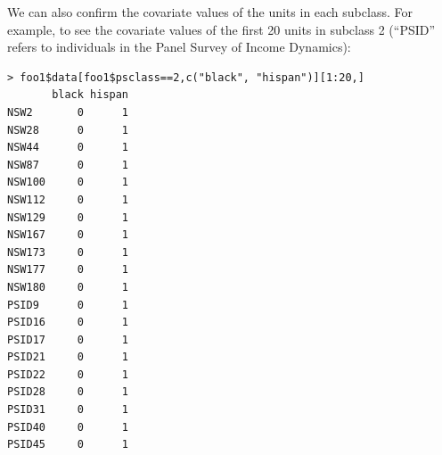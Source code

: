 \documentclass[oneside,letterpaper,titlepage]{article}
\begin{document}
We can also confirm the covariate values of the units in each
subclass.  For example, to see the covariate values of the first 20
units in subclass 2 (``PSID'' refers to individuals in the Panel
Survey of Income Dynamics):
\begin{verbatim}
> foo1$data[foo1$psclass==2,c("black", "hispan")][1:20,]
       black hispan
NSW2       0      1
NSW28      0      1
NSW44      0      1
NSW87      0      1
NSW100     0      1
NSW112     0      1
NSW129     0      1
NSW167     0      1
NSW173     0      1
NSW177     0      1
NSW180     0      1
PSID9      0      1
PSID16     0      1
PSID17     0      1
PSID21     0      1
PSID22     0      1
PSID28     0      1
PSID31     0      1
PSID40     0      1
PSID45     0      1
\end{verbatim}




 
 
 
 
 
 
 
\end{document}
